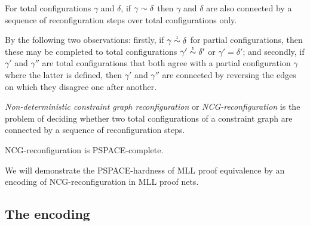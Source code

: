 \documentclass[conference]{IEEEtran}
\let\capsabbrev=\uppercase
\begin{document}
\begin{proposition}
\label{prop:partial simulates total reconfiguration}
For total configurations $\gamma$ and $\delta$, if $\gamma\perm\delta$ then $\gamma$ and $\delta$ are also connected by a sequence of reconfiguration steps over total configurations only.
\end{proposition}


\begin{IEEEproof}
By the following two observations: firstly, 
%
if $\gamma\perm*\delta$ for partial configurations, then these may be completed to total configurations $\gamma'\perm*\delta'$ or $\gamma'=\delta'$; and secondly,
%
if $\gamma'$ and $\gamma''$ are total configurations that both agree with a partial configuration $\gamma$ where the latter is defined, then $\gamma'$ and $\gamma''$ are connected by reversing the edges on which they disagree one after another.
%
\end{IEEEproof}


\emph{Non-deterministic constraint graph reconfiguration} or \emph{\capsabbrev{ncg}-reconfiguration} is the problem of deciding whether two total configurations of a constraint graph are connected by a sequence of reconfiguration steps.
%



\begin{theorem}
\capsabbrev{ncg}-reconfiguration is \capsabbrev{pspace}-complete.
\end{theorem}

%


We will demonstrate the \capsabbrev{pspace}-hardness of \capsabbrev{mll} proof equivalence by an encoding of \capsabbrev{ncg}-reconfiguration in \capsabbrev{mll} proof nets.



\subsection*{The encoding}
\end{document}
